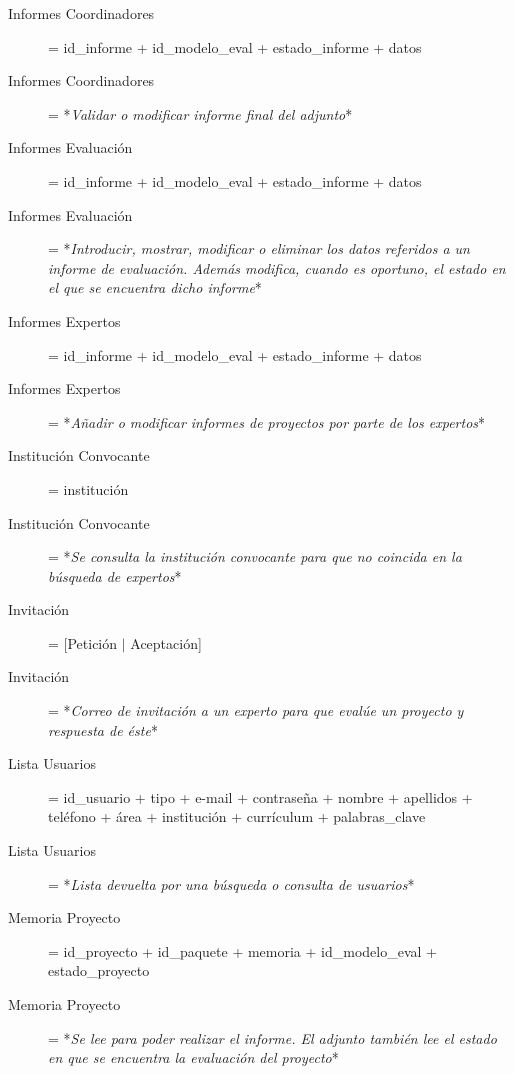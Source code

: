 \documentclass[12pt,a4paper,spanish,twoside]{book}
\begin{document}
\begin{description}
\item[Informes Coordinadores] = id\_informe + id\_modelo\_eval +
  estado\_informe + datos 

\item[Informes Coordinadores] = *\emph{Validar o modificar informe final del
    adjunto}* 

\item[Informes Evaluación] = id\_informe + id\_modelo\_eval + estado\_informe
  + datos 

\item[Informes Evaluación] = *\emph{Introducir, mostrar, modificar o eliminar
    los datos referidos a un informe de evaluación. Además modifica, cuando
    es oportuno, el estado en el que se encuentra dicho informe}* 

\item[Informes Expertos] = id\_informe + id\_modelo\_eval + estado\_informe +
  datos 

\item[Informes Expertos] = *\emph{Añadir o modificar informes de proyectos
    por parte de los expertos}* 

\item[Institución Convocante] = institución

\item[Institución Convocante] = *\emph{Se consulta la institución convocante
    para que no coincida en la búsqueda de expertos}* 

\item[Invitación] = [Petición $\mid$ Aceptación]

\item[Invitación] = *\emph{Correo de invitación a un experto para que evalúe
    un proyecto y respuesta de éste}* 

\item[Lista Usuarios] = {id\_usuario + tipo + e-mail + contraseña + nombre +
    apellidos + teléfono + área + institución + currículum +
    {palabras\_clave}} 

\item[Lista Usuarios] = *\emph{Lista devuelta por una búsqueda o consulta de
    usuarios}* 

\item[Memoria Proyecto] = id\_proyecto + id\_paquete + memoria +
  id\_modelo\_eval + estado\_proyecto 

\item[Memoria Proyecto] = *\emph{Se lee para poder realizar el informe. El
    adjunto también lee el estado en que se encuentra la evaluación del
    proyecto}* 


\end{description}
\end{document}
